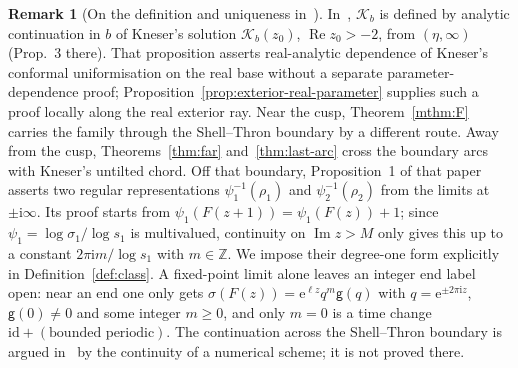 \documentclass[11pt]{amsart}
\theoremstyle{definition}
\newtheorem{remark}[theorem]{Remark}
\newcommand{\eee}{\mathrm{e}}
\newcommand{\ii}{\mathrm{i}}
\begin{document}
\begin{remark}[On the definition and uniqueness in~\cite{Paulsen2019}]\label{rem:paulsen}
In~\cite{Paulsen2019}, $\mathcal K_b$ is defined by analytic continuation in $b$ of
Kneser's solution $\mathcal K_b(z_0)$, $\operatorname{Re}z_0>-2$, from $(\eta,\infty)$
(Prop.~3 there).  That proposition asserts real-analytic dependence of
Kneser's conformal uniformisation on the real base without a separate
parameter-dependence proof; Proposition~\ref{prop:exterior-real-parameter}
supplies such a proof locally along the real exterior ray.  Near the cusp, Theorem~\ref{mthm:F} carries the family through
the Shell--Thron boundary by a different route.  Away from the cusp,
Theorems~\ref{thm:far} and~\ref{thm:last-arc} cross the boundary arcs with
Kneser's untilted chord.  Off that boundary, Proposition~1 of
that paper asserts two
regular representations $\psi_1^{-1}(\rho_1)$ and
$\psi_2^{-1}(\rho_2)$ from the limits at $\pm\ii\infty$.  Its proof starts from
$\psi_1(F(z+1))=\psi_1(F(z))+1$; since $\psi_1=\log\sigma_1/\log s_1$ is
multivalued, continuity on $\operatorname{Im}z>M$ only gives this up to a
constant $2\pi\ii m/\log s_1$ with $m\in\mathbb Z$.
We impose their degree-one form explicitly in
Definition~\ref{def:class}.  A fixed-point limit alone leaves an integer
end label open: near an end one only gets
$\sigma(F(z))=\eee^{\ell z}q^m\mathsf g(q)$ with $q=\eee^{\pm2\pi\ii z}$, $\mathsf g(0)\ne0$ and some
integer $m\ge0$, and only $m=0$ is a time change $\mathrm{id}+(\text{bounded
periodic})$.  The continuation across the Shell--Thron boundary is
argued in~\cite[\S5]{Paulsen2019} by the continuity of a numerical scheme; it is
not proved there.


\end{remark}
\end{document}
